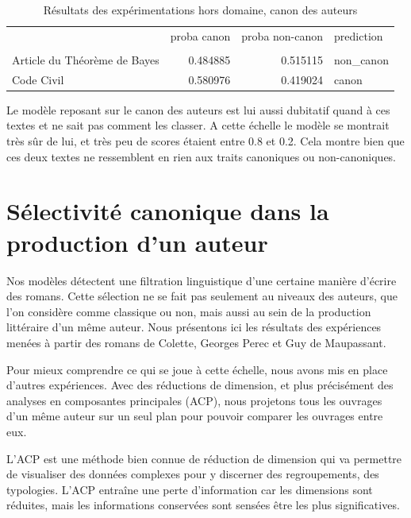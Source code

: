 \begin{table}[ht]
    \centering
    \begin{tabular}{lrrl}
    \toprule
    {} &  proba canon & proba non-canon &    prediction \\
                     &                  &              &             \\
    \midrule
    Article du Théorème de Bayes  &      0.484885  &    0.515115  &    non\_canon \\
    Code Civil                &      0.580976  &    0.419024  &         canon \\
    \bottomrule

    \end{tabular}
    \caption{Résultats des expérimentations hors domaine, canon des auteurs}
\end{table}

Le modèle reposant sur le canon des auteurs est lui aussi dubitatif quand à ces textes et ne sait pas comment les classer. A cette échelle le modèle se montrait très sûr de lui, et très peu de scores étaient entre 0.8 et 0.2. Cela montre bien que ces deux textes ne ressemblent en rien aux traits canoniques ou non-canoniques.

\newpage

\section{Sélectivité canonique dans la production d'un auteur}

Nos modèles détectent une filtration linguistique d'une certaine manière d'écrire des romans. Cette sélection ne se fait pas seulement au niveaux des auteurs, que l'on considère comme classique ou non, mais aussi au sein de la production littéraire d'un même auteur. Nous présentons ici les résultats des expériences menées à partir des romans de Colette, Georges Perec et Guy de Maupassant.

Pour mieux comprendre ce qui se joue à cette échelle, nous avons mis en place d'autres expériences. Avec des réductions de dimension, et plus précisément des analyses en composantes principales (ACP), nous projetons tous les ouvrages d'un même auteur sur un seul plan pour pouvoir comparer les ouvrages entre eux. 

L’ACP est une méthode bien connue de réduction de dimension qui va permettre de visualiser des données complexes pour y discerner des regroupements, des typologies. L'ACP entraîne une perte d'information car les dimensions sont réduites, mais les informations conservées sont sensées être les plus significatives.

